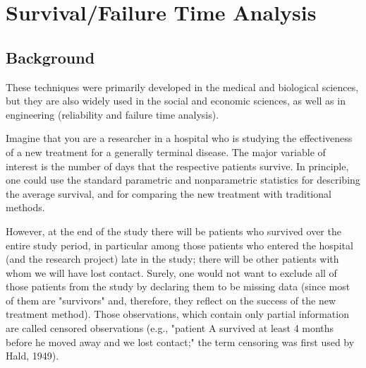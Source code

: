 \documentclass[11pt]{article} %
\begin{document}
\section{Survival/Failure Time Analysis}





\subsection{Background}
These techniques were primarily developed in the medical and biological sciences, but they are also widely used in the social and economic sciences, as well as in engineering (reliability and failure time analysis).

Imagine that you are a researcher in a hospital who is studying the effectiveness of a new treatment for a generally terminal disease. The major variable of interest is the number of days that the respective patients survive. In principle, one could use the standard parametric and nonparametric statistics for describing the average survival, and for comparing the new treatment with traditional methods. 

However, at the end of the study there will be patients who survived over the entire study period, in particular among those patients who entered the hospital (and the research project) late in the study; there will be other patients with whom we will have lost contact. Surely, one would not want to exclude all of those patients from the study by declaring them to be missing data (since most of them are "survivors" and, therefore, they reflect on the success of the new treatment method). Those observations, which contain only partial information are called censored observations (e.g., "patient A survived at least 4 months before he moved away and we lost contact;" the term censoring was first used by Hald, 1949).
\end{document}
